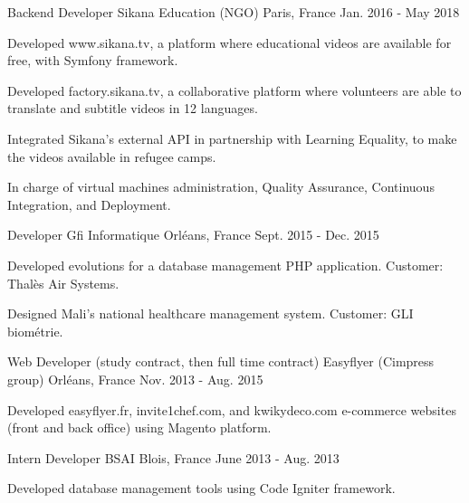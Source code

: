 \begin{cventries}
  \cventry
    {Backend Developer}
    {Sikana Education (NGO)}
    {Paris, France}
    {Jan. 2016 - May 2018}
    {
      \begin{cvitems}
        \item {Developed www.sikana.tv, a platform where educational videos are available for free, with Symfony framework.}
        \item {Developed factory.sikana.tv, a collaborative platform where volunteers are able to translate and subtitle videos in 12 languages.}
        \item {Integrated Sikana's external API in partnership with Learning Equality, to make the videos available in refugee camps.}
        \item {In charge of virtual machines administration, Quality Assurance, Continuous Integration, and Deployment.}
      \end{cvitems}
    }
  \cventry
    {Developer}
    {Gfi Informatique}
    {Orléans, France}
    {Sept. 2015 - Dec. 2015}
    {
      \begin{cvitems}
        \item {Developed evolutions for a database management PHP application. Customer: Thalès Air Systems.}
        \item {Designed Mali's national healthcare management system. Customer: GLI biométrie.}
      \end{cvitems}
    }
  \cventry
    {Web Developer (study contract, then full time contract)}
    {Easyflyer (Cimpress group)}
    {Orléans, France}
    {Nov. 2013 - Aug. 2015}
    {
      \begin{cvitems}
        \item {Developed easyflyer.fr, invite1chef.com, and kwikydeco.com e-commerce websites (front and back office) using Magento platform.}
      \end{cvitems}
    }
  \cventry
    {Intern Developer}
    {BSAI}
    {Blois, France}
    {June 2013 - Aug. 2013}
    {
      \begin{cvitems}
        \item {Developed database management tools using Code Igniter framework.}
      \end{cvitems}
    }
\end{cventries}
